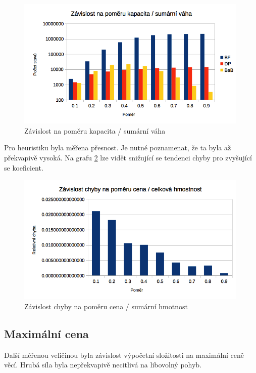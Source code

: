 \documentclass[a4paper]{article}
\begin{document}
		\begin{figure}[h]\centering
			\includegraphics[width=0.99\textwidth]{states-capVsWeight.png} 
			\caption{Závislost na poměru kapacita / sumární váha}
			\label{states-capVsWeight}
		\end{figure}
	
		Pro heuristiku byla měřena přesnost. Je nutné poznamenat, že ta byla až překvapivě vysoká. Na grafu \ref{err-capVsWeight} lze vidět snižující se tendenci chyby pro zvyšující se koeficient.

		\begin{figure}[h]\centering
			\includegraphics[width=0.99\textwidth]{err-capVsWeight.png} 
			\caption{Závislost chyby na poměru cena / sumární hmotnost}
			\label{err-capVsWeight}
		\end{figure}
	
	\subsection{Maximální cena}
	
		Další měřenou veličinou byla závislost výpočetní složitosti na maximální ceně věcí. Hrubá síla byla nepřekvapivě necitlivá na libovolný pohyb.
	
\end{document}
